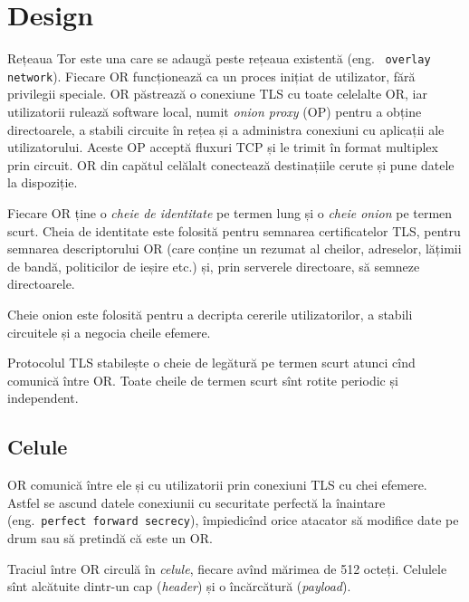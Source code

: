 
\chapter{Design}

\indent\indent Rețeaua Tor este una care se adaugă peste rețeaua existentă (eng.\ %
\texttt{overlay network}).  Fiecare OR funcționează
ca un proces inițiat de utilizator, fără privilegii speciale. OR păstrează
o conexiune TLS cu toate celelalte OR, iar utilizatorii rulează
software local, numit \emph{onion proxy} (OP)  pentru
a obține directoarele, a stabili circuite în rețea și a administra
conexiuni cu aplicații ale utilizatorului. Aceste OP acceptă fluxuri TCP
și le trimit în format multiplex prin circuit. OR din capătul celălalt
conectează destinațiile cerute și pune datele la dispoziție.

Fiecare OR ține o \textit{cheie de identitate} pe termen lung și o \textit{cheie onion}
pe termen scurt.  
Cheia de identitate este folosită pentru semnarea
certificatelor TLS, pentru semnarea descriptorului OR (care conține un
rezumat al cheilor, adreselor, lățimii de bandă, politicilor de ieșire etc.) și,
prin serverele directoare, să semneze directoarele.

Cheie onion este folosită pentru a decripta cererile utilizatorilor, a stabili
circuitele și a negocia cheile efemere.

Protocolul TLS stabilește o cheie de legătură pe termen scurt
atunci cînd comunică între OR. Toate cheile de termen scurt sînt rotite periodic
și independent.

\section{Celule}

\indent\indent OR comunică între ele și cu utilizatorii prin conexiuni TLS cu chei efemere.
Astfel se ascund datele conexiunii cu securitate perfectă la înaintare
(eng.\ \texttt{perfect forward secrecy}), împiedicînd orice atacator să
modifice date pe drum sau să pretindă că este un OR.

Traciul între OR circulă în \emph{celule}, fiecare avînd mărimea de 512 octeți.
Celulele sînt alcătuite dintr-un cap (\emph{header}) și o încărcătură
(\emph{payload}). 


